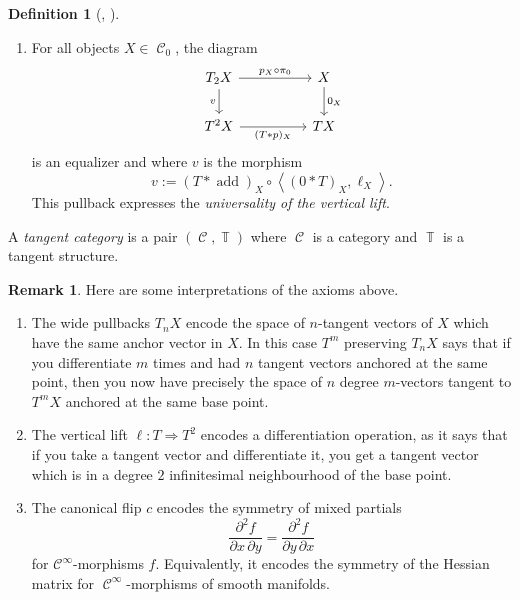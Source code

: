 \documentclass{amsart}
\theoremstyle{definition}
\newtheorem{remark}[equation]{Remark}
\newtheorem{definition}[equation]{Definition}
\DeclareMathOperator{\Cscr}{\mathscr{C}}
\DeclareMathOperator{\Tbb}{\mathbb{T}}
\DeclareMathOperator{\Ccal}{\mathcal{C}}
\numberwithin{equation}{subsection}
\begin{document}
\begin{definition}[{\cite[Definition 2.3]{GeoffRobinDiffStruct}, \cite{GeoffRobinBundle}}]
\begin{enumerate}
\[\begin{tikzcd}
			T^3 \ar[r, swap]{}{c \ast T} & T^3 \ar[r, swap]{}{T \ast c} & T^3
		\end{tikzcd}\quad
		\begin{tikzcd}
			T \ar[r]{}{\ell} \ar[d, swap]{}{\ell} & T^2 \ar[d]{}{T \ast \ell} \\
			T^2 \ar[r, swap]{}{\ell \ast T} & T^3
		\end{tikzcd}\quad
		\begin{tikzcd}
			T^2 \ar[d, swap]{}{c} \ar[r]{}{\ell \ast T} & T^3 \ar[r]{}{T \ast c} & T^3 \ar[d]{}{c \ast T} \\
			T^2 \ar[rr, swap]{}{T \ast \ell} & & T^3
		\end{tikzcd}
		\]
		all hold in $[\Cscr,\Cscr]$.
		\item For all objects $X \in \Cscr_0$, the diagram
		\[
		\begin{tikzcd}
		T_2X \ar[rr]{}{p_X\circ \pi_0} \ar[d, swap]{}{v} & & X \ar[d]{}{0_X} \\
		T^2X \ar[rr, swap]{}{(T \ast p)_X} & & TX
		\end{tikzcd}
		\]
		is an equalizer and where $v$ is the morphism
		\[
		v := (T \ast \operatorname{add})_X \circ \left\langle (0 \ast T)_X, \ell_X \right\rangle.
		\] 
		This pullback expresses the \emph{universality of the vertical lift}.
	\end{enumerate}
	A \emph{tangent category} is a pair $(\Cscr,\Tbb)$ where $\Cscr$ is a category and $\Tbb$ is a tangent structure.
\end{definition}
\begin{remark}
	Here are some interpretations of the axioms above.
	\begin{enumerate}
		\item The wide pullbacks $T_nX$ encode the space of $n$-tangent vectors of $X$ which have the same anchor vector in $X$. In this case $T^m$ preserving $T_nX$ says that if you differentiate $m$ times and had $n$ tangent vectors anchored at the same point, then you now have precisely the space of $n$ degree $m$-vectors tangent to $T^mX$ anchored at the same base point.
		\item The vertical lift $\ell:T \Rightarrow T^2$ encodes a differentiation operation, as it says that if you take a tangent vector and differentiate it, you get a tangent vector which is in a degree $2$ infinitesimal neighbourhood of the base point.
		\item The canonical flip $c$ encodes the symmetry of mixed partials
		\[
		\frac{\partial^2f}{\partial x\,\partial y} = \frac{\partial^2f}{\partial y\,\partial x}
		\]
		for $\mathcal{C}^{\infty}$-morphisms $f$. Equivalently, it encodes the symmetry of the Hessian matrix for $\Ccal^{\infty}$-morphisms of smooth manifolds.
	\end{enumerate}
\end{remark}
\end{document}
